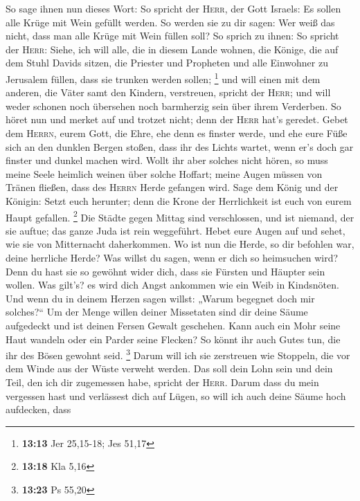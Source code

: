  So sage ihnen nun dieses Wort: So spricht der
\textsc{Herr}, der Gott Israels: Es sollen alle Krüge mit Wein gefüllt
werden. So werden sie zu dir sagen: Wer weiß das nicht, dass man alle
Krüge mit Wein füllen soll?  So sprich zu ihnen: So
spricht der \textsc{Herr}: Siehe, ich will alle, die in diesem Lande
wohnen, die Könige, die auf dem Stuhl Davids sitzen, die Priester und
Propheten und alle Einwohner zu Jerusalem füllen, dass sie trunken
werden sollen; \footnote{\textbf{13:13} Jer 25,15-18; Jes 51,17}
 und will einen mit dem anderen, die Väter samt den
Kindern, verstreuen, spricht der \textsc{Herr}; und will weder schonen
noch übersehen noch barmherzig sein über ihrem Verderben.
 So höret nun und merket auf und trotzet nicht; denn der
\textsc{Herr} hat's geredet.  Gebet dem \textsc{Herrn},
eurem Gott, die Ehre, ehe denn es finster werde, und ehe eure Füße sich
an den dunklen Bergen stoßen, dass ihr des Lichts wartet, wenn er's doch
gar finster und dunkel machen wird.  Wollt ihr aber
solches nicht hören, so muss meine Seele heimlich weinen über solche
Hoffart; meine Augen müssen von Tränen fließen, dass des \textsc{Herrn}
Herde gefangen wird.  Sage dem König und der Königin:
Setzt euch herunter; denn die Krone der Herrlichkeit ist euch von eurem
Haupt gefallen. \footnote{\textbf{13:18} Kla 5,16}  Die
Städte gegen Mittag sind verschlossen, und ist niemand, der sie auftue;
das ganze Juda ist rein weggeführt.  Hebet eure Augen auf
und sehet, wie sie von Mitternacht daherkommen. Wo ist nun die Herde, so
dir befohlen war, deine herrliche Herde?  Was willst du
sagen, wenn er dich so heimsuchen wird? Denn du hast sie so gewöhnt
wider dich, dass sie Fürsten und Häupter sein wollen. Was gilt's? es
wird dich Angst ankommen wie ein Weib in Kindsnöten.  Und
wenn du in deinem Herzen sagen willst: „Warum begegnet doch mir
solches?{}`` Um der Menge willen deiner Missetaten sind dir deine Säume
aufgedeckt und ist deinen Fersen Gewalt geschehen.  Kann
auch ein Mohr seine Haut wandeln oder ein Parder seine Flecken? So könnt
ihr auch Gutes tun, die ihr des Bösen gewohnt seid. \footnote{\textbf{13:23}
  Ps 55,20}  Darum will ich sie zerstreuen wie Stoppeln,
die vor dem Winde aus der Wüste verweht werden.  Das soll
dein Lohn sein und dein Teil, den ich dir zugemessen habe, spricht der
\textsc{Herr}. Darum dass du mein vergessen hast und verlässest dich auf
Lügen,  so will ich auch deine Säume hoch aufdecken, dass
